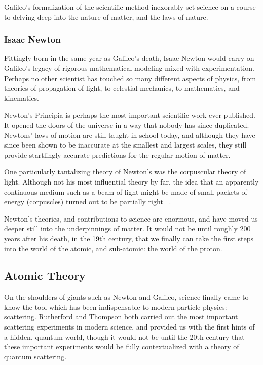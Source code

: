 Galileo's formalization of the scientific method inexorably set science on a
course to delving deep into the nature of matter, and the laws of nature.

\subsubsection{Isaac Newton}
Fittingly born in the same year as Galileo's death, Isaac Newton would carry on
Galileo's legacy of rigorous mathematical modeling mixed with experimentation.
Perhaps no other scientist has touched so many different aspects of physics,
from theories of propagation of light, to celestial mechanics, to mathematics,
and kinematics.

Newton's Principia is perhaps the most important scientific work ever published.
It opened the doors of the universe in a way that nobody has since duplicated.
Newtons' laws of motion are still taught in school today, and although they have
since been shown to be inaccurate at the smallest and largest scales, they still
provide startlingly accurate predictions for the regular motion of matter.

One particularly tantalizing theory of Newton's was the corpuscular theory of
light. Although not his most influential theory by far, the idea that an
apparently continuous medium such as a beam of light might be made of small
packets of energy (corpuscles) turned out to be partially right ~\needcite{}.

Newton's theories, and contributions to science are enormous, and have moved us
deeper still into the underpinnings of matter. It would not be until roughly 200
years after his death, in the 19th century, that we finally can take the first
steps into the world of the atomic, and sub-atomic: the world of the proton. 

\clearpage
\subsection{Atomic Theory}

On the shoulders of giants such as Newton and Galileo, science finally came to
know the tool which has been indispensable to modern particle physics:
scattering. Rutherford and Thompson both carried out the most important
scattering experiments in modern science, and provided us with the first hints
of a hidden, quantum world, though it would not be until the 20th century that
these important experiments would be fully contextualized with a theory of
quantum scattering.

